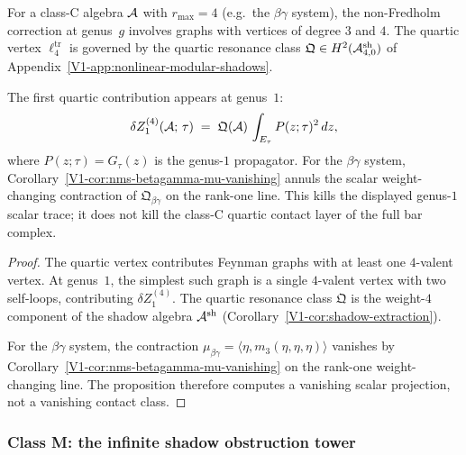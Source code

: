 \begin{proposition}%
%
For a class-C algebra $\mathcal{A}$ with $r_{\max} = 4$
\textup{(}e.g.\ the $\beta\gamma$ system\textup{)},
the non-Fredholm correction at genus~$g$ involves
graphs with vertices of degree $3$ and $4$.
The quartic vertex $\ell_4^{\mathrm{tr}}$ is governed by the
quartic resonance class
$\mathfrak{Q} \in H^2(\mathcal{A}^{\mathrm{sh}}_{4,0})$
of Appendix~\textup{\ref*{V1-app:nonlinear-modular-shadows}}.

The first quartic contribution appears at genus~$1$:
\begin{equation}%
\delta Z_1^{(4)}(\cA;\,\tau)
\;=\;
\mathfrak{Q}(\cA)\,
\int_{E_\tau}
P(z;\tau)^2\,dz,
\end{equation}
where $P(z;\tau) = G_\tau(z)$ is the genus-$1$ propagator.
For the $\beta\gamma$ system, Corollary~\textup{\ref*{V1-cor:nms-betagamma-mu-vanishing}}
annuls the scalar weight-changing contraction of
$\mathfrak{Q}_{\beta\gamma}$ on the rank-one line. This kills the
displayed genus-$1$ scalar trace; it does not kill the class-C
quartic contact layer of the full bar complex.
\end{proposition}

\begin{proof}
The quartic vertex contributes Feynman graphs with at least one
$4$-valent vertex. At genus~$1$, the simplest such graph is a
single $4$-valent vertex with two self-loops, contributing
$\delta Z_1^{(4)}$. The quartic resonance class $\mathfrak{Q}$
is the weight-$4$ component of the shadow algebra $\mathcal{A}^{\mathrm{sh}}$
(Corollary~\ref*{V1-cor:shadow-extraction}).

For the $\beta\gamma$ system, the contraction
$\mu_{\beta\gamma}=\langle \eta,m_3(\eta,\eta,\eta)\rangle$ vanishes
by Corollary~\ref*{V1-cor:nms-betagamma-mu-vanishing} on the
rank-one weight-changing line. The proposition therefore computes a
vanishing scalar projection, not a vanishing contact class.
\end{proof}

\subsubsection{Class M: the infinite shadow obstruction tower}


